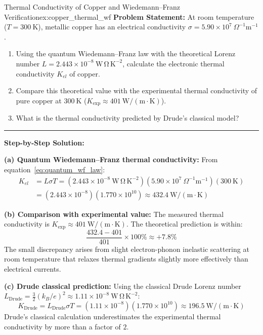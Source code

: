 \documentclass[11pt,a4paper]{article}
\begin{document}
\vspace{0.4cm}

\begin{examplebox}{Thermal Conductivity of Copper and Wiedemann--Franz Verification}{ex:copper_thermal_wf}
\textbf{Problem Statement:}
At room temperature ($T = 300\ \mathrm{K}$), metallic copper has an electrical conductivity $\sigma = 5.90 \times 10^7\ \Omega^{-1}\mathrm{m}^{-1}$.
\begin{enumerate}[label=(\alph*)]
    \item Using the quantum Wiedemann--Franz law with the theoretical Lorenz number $L = 2.443 \times 10^{-8}\ \mathrm{W\,\Omega\,K^{-2}}$, calculate the electronic thermal conductivity $K_{el}$ of copper.
    \item Compare this theoretical value with the experimental thermal conductivity of pure copper at $300\ \mathrm{K}$ ($K_{\mathrm{exp}} \approx 401\ \mathrm{W/(m\cdot K)}$).
    \item What is the thermal conductivity predicted by Drude's classical model?
\end{enumerate}

\vspace{0.2cm}\hrule\vspace{0.2cm}
\textbf{Step-by-Step Solution:}

\textbf{(a) Quantum Wiedemann--Franz thermal conductivity:}
From equation~\eqref{eq:quantum_wf_law}:
\begin{align*}
K_{el} &= L \sigma T = (2.443 \times 10^{-8}\ \mathrm{W\,\Omega\,K^{-2}})(5.90 \times 10^7\ \Omega^{-1}\mathrm{m}^{-1})(300\ \mathrm{K}) \\
&= (2.443 \times 10^{-8})(1.770 \times 10^{10}) \approx \mathbf{432.4\ \mathrm{W/(m\cdot K)}}
\end{align*}

\textbf{(b) Comparison with experimental value:}
The measured thermal conductivity is $K_{\mathrm{exp}} \approx 401\ \mathrm{W/(m\cdot K)}$.
The theoretical prediction is within:
\[
\frac{432.4 - 401}{401} \times 100\% \approx +\mathbf{7.8\%}
\]
The small discrepancy arises from slight electron-phonon inelastic scattering at room temperature that relaxes thermal gradients slightly more effectively than electrical currents.

\textbf{(c) Drude classical prediction:}
Using the classical Drude Lorenz number $L_{\mathrm{Drude}} = \frac{3}{2}(k_B/e)^2 \approx 1.11 \times 10^{-8}\ \mathrm{W\,\Omega\,K^{-2}}$:
\[
K_{\mathrm{Drude}} = L_{\mathrm{Drude}} \sigma T = (1.11 \times 10^{-8})(1.770 \times 10^{10}) \approx \mathbf{196.5\ \mathrm{W/(m\cdot K)}}
\]
Drude's classical calculation underestimates the experimental thermal conductivity by more than a factor of $2$.
\end{examplebox}
\end{document}
